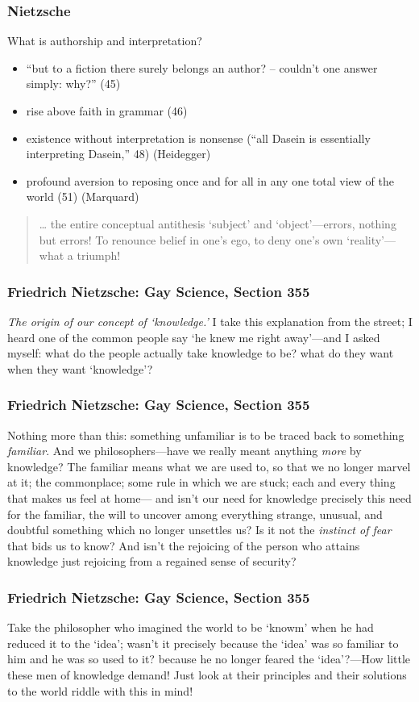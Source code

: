 \documentclass[xcolor=dvipsnames]{beamer}
\begin{document}
\begin{frame}
  \frametitle{Nietzsche}
  What is authorship and interpretation?
  \begin{itemize}
  \item ``but to a fiction there surely belongs an author? -- couldn't
    one answer simply: why?'' (45)
  \item rise above faith in grammar (46)
  \item existence without interpretation is nonsense (``all Dasein is
    essentially interpreting Dasein,'' 48) (Heidegger)
  \item profound aversion to reposing once and for all in any one
    total view of the world (51) (Marquard)
  \end{itemize}
\begin{quote}
  {\ldots} the entire conceptual antithesis `subject' and
  `object'---errors, nothing but errors! To renounce belief in one's
  ego, to deny one's own `reality'---what a triumph! 
\end{quote}
\end{frame}

\begin{frame}
  \frametitle{Friedrich Nietzsche: Gay Science, Section 355}
  \emph{The origin of our concept of `knowledge.'} I take this
  explanation from the street; I heard one of the common people say
  `he knew me right away'---and I asked myself: what do the people
  actually take knowledge to be? what do they want when they want
  `knowledge'?
\end{frame}

\begin{frame}
  \frametitle{Friedrich Nietzsche: Gay Science, Section 355}
  Nothing more than this: something unfamiliar is to be traced back to
  something \emph{familiar}. And we philosophers---have we really
  meant anything \emph{more} by knowledge? The familiar means what we
  are used to, so that we no longer marvel at it; the commonplace;
  some rule in which we are stuck; each and every thing that makes us
  feel at home--- and isn't our need for knowledge precisely this need
  for the familiar, the will to uncover among everything strange,
  unusual, and doubtful something which no longer unsettles us? Is it
  not the \emph{instinct of fear} that bids us to know? And isn't the
  rejoicing of the person who attains knowledge just rejoicing from a
  regained sense of security?
\end{frame}

\begin{frame}
  \frametitle{Friedrich Nietzsche: Gay Science, Section 355}
  Take the philosopher who imagined the world to be `knowm' when he
  had reduced it to the `idea'; wasn't it precisely because the `idea'
  was so familiar to him and he was so used to it? because he no
  longer feared the `idea'?---How little these men of knowledge
  demand! Just look at their principles and their solutions to the
  world riddle with this in mind!
\end{frame}
\end{document}
